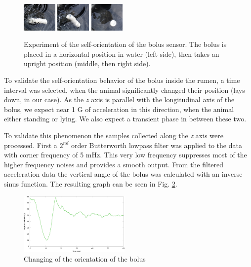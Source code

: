 \documentclass[conference]{IEEEtran}
\begin{document}
\begin{figure}[htbp]
  \centerline{
    \includegraphics[width=0.15\textwidth]{fig/kfj_1.png}
    \includegraphics[width=0.15\textwidth]{fig/kfj_2.png}
    \includegraphics[width=0.15\textwidth]{fig/kfj_3.png}
  }
  \caption{Experiment of the self-orientation of the bolus sensor. The
  bolus is placed in a horizontal position in water (left side), then takes
  an upright position (middle, then right side).}
  \label{self-orientation-experiment}
\end{figure}

To validate the self-orientation behavior of the bolus inside the rumen, a time
interval was selected, when the animal significantly changed their position
(lays down, in our case). As the \emph{z} axis is parallel with the
longitudinal axis of the bolus, we expect near 1 G of acceleration in this
direction, when the animal either standing or lying. We also expect a transient
phase in between these two.

To validate this phenomenon the samples collected along the \emph{z} axis were
processed. First a $2^{nd}$ order Butterworth lowpass filter was applied to the
data with corner frequency of 5 mHz. This very low frequency suppresses most of
the higher frequency noises and provides a smooth output. From the filtered
acceleration data the vertical angle of the bolus was calculated with an
inverse sinus function. The resulting graph can be seen in Fig.
\ref{auto-orientation}.

\begin{figure}[htbp]
\centerline{\includegraphics[width=0.48\textwidth]{fig/auto-orientation.png}}
  \caption{Changing of the orientation of the bolus}
\label{auto-orientation}
\end{figure}
\end{document}

